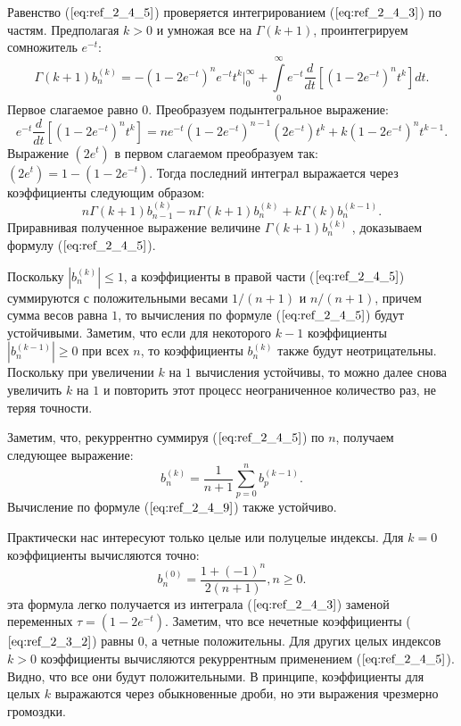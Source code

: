 Равенство ($\ref{eq:ref_2_4_5}$) проверяется интегрированием ($\ref{eq:ref_2_4_3}$) по частям. Предполагая
$k > 0$ и умножая все на $\Gamma(k + 1)$, проинтегрируем сомножитель $e^{-t}$:
\begin{equation}
\Gamma(k+1)b_n^{(k)}=-(1-2e^{-t})^ne^{-t}t^k\Big|_0^{\infty} + \int\limits_0^{\infty} e^{-t}\frac{d}{dt}[(1-2e^{-t})^nt^k]dt.
\label{eq:ref_2_4_6} 
\end{equation}
Первое слагаемое равно $0$. Преобразуем подынтегральное выражение:
\begin{equation}
 e^{-t}\frac{d}{dt}[(1-2e^{-t})^nt^k]=ne^{-t}(1-2e^{-t})^{n-1}(2e^{-t})t^k+k(1-2e^{-t})^nt^{k-1}.
\label{eq:ref_2_4_7}
\end{equation}
Выражение $(2e^{t})$  в первом слагаемом преобразуем так: \linebreak $(2e^{t})= 1-(1-2e^{-t})$.
Тогда последний интеграл выражается через коэффициенты следующим
образом:
\begin{equation}
n\Gamma(k+1)b_{n-1}^{(k)}-n\Gamma(k+1)b_n^{(k)}+k\Gamma(k)b_n^{(k-1)}.
\label{eq:ref_2_4_8}
\end{equation}
Приравнивая полученное выражение величине $\Gamma{(k+1)}b_n^{(k)}$ , доказываем формулу ($\ref{eq:ref_2_4_5}$).

Поскольку $|b_n^{(k)}| \leqslant 1$, а коэффициенты в правой части ($\ref{eq:ref_2_4_5}$) суммируются с
положительными весами $1/(n + 1)$ и $n/(n + 1)$, причем сумма весов равна $1$, то
вычисления по формуле ($\ref{eq:ref_2_4_5}$) будут устойчивыми. Заметим, что если для
некоторого $k - 1$ коэффициенты $|b_n^{(k-1)}| \geqslant 0$ при всех $n$, то коэффициенты $b_n^{(k)}$ также будут неотрицательны. Поскольку при увеличении $k$ на $1$ вычисления
устойчивы, то можно далее снова увеличить $k$ на $1$ и повторить этот процесс
неограниченное количество раз, не теряя точности.

Заметим, что, рекуррентно суммируя ($\ref{eq:ref_2_4_5}$) по $n$, получаем следующее выражение:
\begin{equation}
b_n^{(k)}=\frac{1}{n+1}\sum\limits_{p=0}^n b_p^{(k-1)}.
\label{eq:ref_2_4_9}
\end{equation}
Вычисление по формуле ($\ref{eq:ref_2_4_9}$) также устойчиво.

Практически нас интересуют только целые или полуцелые индексы. Для
$k = 0$ коэффициенты вычисляются точно:
\begin{equation}
b_n^{(0)}=\frac{1+(-1)^n}{2(n+1)},n \geqslant 0.
\label{eq:ref_2_4_10}
\end{equation}
эта формула легко получается из интеграла ($\ref{eq:ref_2_4_3}$) заменой переменных
$\tau = (1 - 2e^{-t})$. Заметим, что все нечетные коэффициенты ($\ref{eq:ref_2_3_2}$) равны $0$, а четные
положительны. Для других целых индексов $k > 0$ коэффициенты вычисляются
рекуррентным применением ($\ref{eq:ref_2_4_5}$). Видно, что все они будут положительными. В
принципе, коэффициенты для целых $k$ выражаются через обыкновенные дроби,
но эти выражения чрезмерно громоздки.

